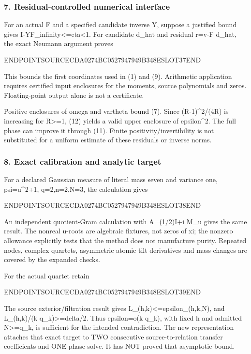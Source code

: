 \subsubsection{7. Residual-controlled numerical interface}\label{endpoint-pr24_original--residual-controlled-numerical-interface}

For an actual F and a specified candidate inverse Y, suppose a justified bound gives \textbar\textbar I-YF\textbar\textbar\_infinity\textless=eta\textless1. For candidate d\_hat and residual r=v-F d\_hat, the exact Neumann argument proves

ENDPOINTSOURCECDA0274BC0527947949B348ESLOT37END

This bounds the first coordinates used in (1) and (9). Arithmetic application requires certified input enclosures for the moments, source polynomials and zeros. Floating-point output alone is not a certificate.

Positive enclosures of omega and vartheta bound (7). Since (R-1)\^{}2/(4R) is increasing for R\textgreater=1, (12) yields a valid upper enclosure of epsilon\^{}2. The full phase can improve it through (11). Finite positivity/invertibility is not substituted for a uniform estimate of these residuals or inverse norms.

\subsubsection{8. Exact calibration and analytic target}\label{endpoint-pr24_original--exact-calibration-and-analytic-target}

For a declared Gaussian measure of literal mass seven and variance one, psi=u\^{}2+1, q=2,n=2,N=3, the calculation gives

ENDPOINTSOURCECDA0274BC0527947949B348ESLOT38END

An independent quotient-Gram calculation with A=(1/2)I+i M\_u gives the same result. The nonreal u-roots are algebraic fixtures, not zeros of xi; the nonzero allowance explicitly tests that the method does not manufacture purity. Repeated nodes, complex quartets, asymmetric atomic tilt derivatives and mass changes are covered by the expanded checks.

For the actual quartet retain

ENDPOINTSOURCECDA0274BC0527947949B348ESLOT39END

The source exterior/filtration result gives L\_(h,k)\textless=epsilon\_(h,k,N), and L\_(h,k)/(k q\_k)\textgreater=delta/2. Thus epsilon=o(k q\_k), with fixed h and admitted N\textgreater=q\_k, is sufficient for the intended contradiction. The new representation attaches that exact target to TWO consecutive source-to-relation transfer coefficients and ONE phase solve. It has NOT proved that asymptotic bound.

